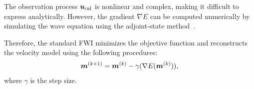 The observation process $\bm{u}_{\mathrm{cal}}$ is nonlinear and complex, making it difficult to express analytically.
However, the gradient $\nabla E$ can be computed numerically by simulating the wave equation using the adjoint-state method~\cite{FWI-gradient}.

Therefore, the standard FWI minimizes the objective function and reconstructs the velocity model using the following procedures:
\begin{equation} \label{eq:FWIWithGradient} \bm{m}^{(k+1)} = \bm{m}^{(k)} - \gamma( \nabla E(\bm{m}^{(k)}) ), \end{equation}
where $\gamma$ is the step size.

